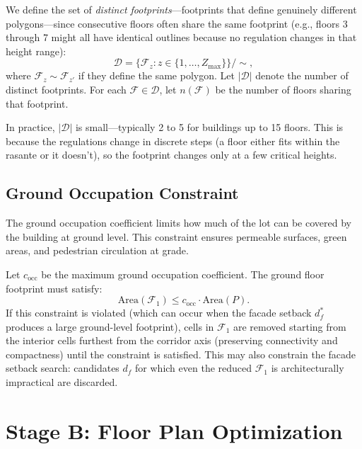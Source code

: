 \documentclass[11pt,a4paper]{article}
\newcommand{\calF}{\mathcal{F}}
\begin{document}
We define the set of \emph{distinct footprints}---footprints that define
genuinely different polygons---since consecutive floors often share the
same footprint (e.g., floors 3 through 7 might all have identical
outlines because no regulation changes in that height range):
\begin{equation}
    \mathcal{D} = \bigl\{\calF_z : z \in \{1,\ldots,Z_{\max}\}\bigr\} \big/ {\sim},
\end{equation}
where $\calF_z \sim \calF_{z'}$ if they define the same polygon. Let
$|\mathcal{D}|$ denote the number of distinct footprints. For each
$\calF \in \mathcal{D}$, let $n(\calF)$ be the number of floors sharing
that footprint.

In practice, $|\mathcal{D}|$ is small---typically 2 to 5 for buildings
up to 15 floors. This is because the regulations change in discrete
steps (a floor either fits within the rasante or it doesn't), so the
footprint changes only at a few critical heights.

\subsection{Ground Occupation Constraint}

The ground occupation coefficient limits how much of the lot can be
covered by the building at ground level. This constraint ensures
permeable surfaces, green areas, and pedestrian circulation at grade.

Let $c_{\text{occ}}$ be the maximum ground occupation coefficient. The
ground floor footprint must satisfy:
\begin{equation}
    \text{Area}(\calF_1) \leq c_{\text{occ}} \cdot \text{Area}(P).
\end{equation}
If this constraint is violated (which can occur when the facade setback
$d_f^*$ produces a large ground-level footprint), cells in $\calF_1$ are
removed starting from the interior cells furthest from the corridor axis
(preserving connectivity and compactness) until the constraint is
satisfied. This may also constrain the facade setback search: candidates
$d_f$ for which even the reduced $\calF_1$ is architecturally
impractical are discarded.


\section{Stage B: Floor Plan Optimization}\label{sec:floorplan}
\end{document}
